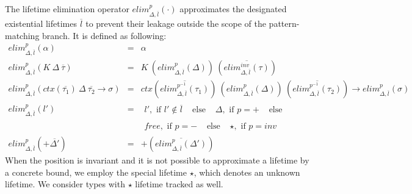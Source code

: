 \documentclass[11pt]{article}
\newcommand{\ap}{~}
\newcommand{\ctx}[1]{ctx\left(#1\right)~}
\begin{document}
    The lifetime elimination operator $elim_{\Delta, \overline{l}}^p(\cdot)$ approximates the designated existential lifetimes $\overline{l}$ to prevent their leakage outside the scope of the pattern-matching branch.
    It is defined as following: %
    \[
        \begin{array}{lll}
            elim_{\Delta, \overline{l}}^p(\alpha) & = & \alpha \\
            elim_{\Delta, \overline{l}}^p(K\ap \Delta\ap\overline{\tau}) & = & K\ap \left( elim_{\Delta, \overline{l}}^p(\Delta) \right)\ap\left( \overline{elim_{\Delta, \overline{l}}^{inv}(\tau)} \right) \\
            elim_{\Delta, \overline{l}}^p(\ctx{\overline{\tau_1}}\Delta~\overline{\tau_2}\to\sigma) & = & \ctx{\overline{elim_{\Delta, \overline{l}}^{p^{-1}}(\tau_1)}} \left( elim_{\Delta, \overline{l}}^p(\Delta) \right)\ap\left( \overline{elim_{\Delta, \overline{l}}^{p^{-1}}(\tau_2)} \right)\to elim_{\Delta, \overline{l}}^{p}(\sigma) \\
            elim_{\Delta, \overline{l}}^{p}(l') & = &
            \begin{array}{llll}
                l', \text{ if } l' \not\in\overline{l} & \text{ else } &
                \Delta, \text{ if } p = + & \text{ else }
            \end{array} \\
            & &
            \begin{array}{llll}
                free, \text{ if } p = - & \text{ else } &
                \star, \text{ if } p = inv
            \end{array} \\
            elim_{\Delta, \overline{l}}^{p}(+\overline{\Delta'}) & = & +\left( \overline{elim_{\Delta, \overline{l}}^{p}(\Delta')} \right)
        \end{array}
    \]
    When the position is invariant and it is not possible to approximate a lifetime by a concrete bound, we employ the special lifetime $\star$, which denotes an unknown lifetime.
    We consider types with $\star$ lifetime tracked as well.
\end{document}
